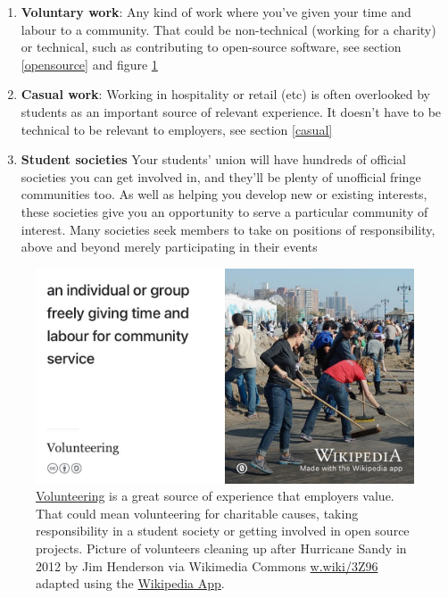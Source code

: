 \documentclass[
]{book}
\providecommand{\tightlist}{%
  \setlength{\itemsep}{0pt}\setlength{\parskip}{0pt}}
\begin{document}
\begin{enumerate}
\def\labelenumi{\arabic{enumi}.}
\tightlist
\item
  \textbf{Voluntary work}: Any kind of work where you've given your time and labour to a community. That could be non-technical (working for a charity) or technical, such as contributing to open-source software, see section \ref{opensource} and figure \ref{fig:volunthero-fig}
\item
  \textbf{Casual work}: Working in hospitality or retail (etc) is often overlooked by students as an important source of relevant experience. It doesn't have to be technical to be relevant to employers, see section \ref{casual}
\item
  \textbf{Student societies} Your students' union will have hundreds of official societies you can get involved in, and they'll be plenty of unofficial fringe communities too. As well as helping you develop new or existing interests, these societies give you an opportunity to serve a particular community of interest. Many societies seek members to take on positions of responsibility, above and beyond merely participating in their events
\end{enumerate}

\begin{figure}

{\centering \includegraphics[width=1\linewidth]{images/volunthero} 

}

\caption{\href{https://en.wikipedia.org/wiki/Volunteering}{Volunteering} is a great source of experience that employers value. That could mean volunteering for charitable causes, taking responsibility in a student society or getting involved in open source projects. Picture of volunteers cleaning up after Hurricane Sandy in 2012 by Jim Henderson via Wikimedia Commons \href{https://w.wiki/3Z96}{w.wiki/3Z96} adapted using the \href{https://apps.apple.com/us/app/wikipedia/id324715238}{Wikipedia App}.}\label{fig:volunthero-fig}
\end{figure}
\end{document}

